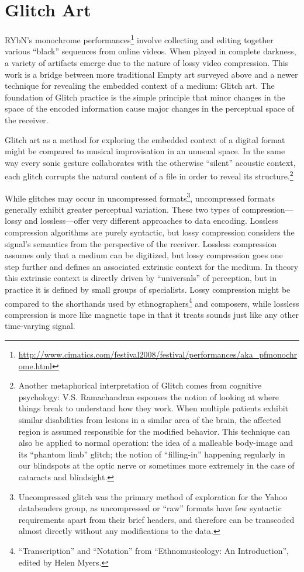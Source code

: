 \documentclass{thesis}
\begin{document}
\section{Glitch Art}

RYbN's monochrome performances\footnote{\url{http://www.cimatics.com/festival2008/festival/performances/aka_pfmonochrome.html}} involve collecting and editing together various ``black'' sequences from online videos. When played in complete darkness, a variety of artifacts emerge due to the nature of lossy video compression. This work is a bridge between more traditional Empty art surveyed above and a newer technique for revealing the embedded context of a medium: Glitch art. The foundation of Glitch practice is the simple principle that minor changes in the space of the encoded information cause major changes in the perceptual space of the receiver.

Glitch art as a method for exploring the embedded context of a digital format might be compared to musical improvisation in an unusual space. In the same way every sonic gesture collaborates with the otherwise ``silent'' acoustic context, each glitch corrupts the natural content of a file in order to reveal its structure.\footnote{Another metaphorical interpretation of Glitch comes from cognitive psychology: V.S. Ramachandran espouses the notion of looking at where things break to understand how they work\cite{ramachandran_phantoms_1999}. When multiple patients exhibit similar disabilities from lesions in a similar area of the brain, the affected region is assumed responsible for the modified behavior. This technique can also be applied to normal operation: the idea of a malleable body-image and its ``phantom limb'' glitch; the notion of ``filling-in'' happening regularly in our blindspots at the optic nerve or sometimes more extremely in the case of cataracts and blindsight.}

While glitches may occur in uncompressed formats\footnote{Uncompressed glitch was the primary method of exploration for the Yahoo databenders group\cite{indianropeburn_databenders_????}, as uncompressed or ``raw'' formats have few syntactic requirements apart from their brief headers, and therefore can be transcoded almost directly without any modifications to the data.}, uncompressed formats generally exhibit greater perceptual variation. These two types of compression---lossy and lossless---offer very different approaches to data encoding. Lossless compression algorithms are purely syntactic, but lossy compression considers the signal's semantics from the perspective of the receiver. Lossless compression assumes only that a medium can be digitized, but lossy compression goes one step further and defines an associated extrinsic context for the medium. In theory this extrinsic context is directly driven by ``universals'' of perception, but in practice it is defined by small groups of specialists. Lossy compression might be compared to the shorthands used by ethnographers\footnote{``Transcription'' and ``Notation'' from ``Ethnomusicology: An Introduction'', edited by Helen Myers.} and composers, while lossless compression is more like magnetic tape in that it treats sounds just like any other time-varying signal.
\end{document}
